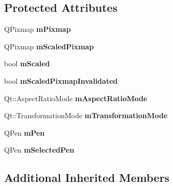 \subsection*{Protected Attributes}
\begin{DoxyCompactItemize}
\item 
Q\+Pixmap {\bfseries m\+Pixmap}\hypertarget{class_q_c_p_item_pixmap_a1396cce7f26c7b8e9512906284380c4d}{}\label{class_q_c_p_item_pixmap_a1396cce7f26c7b8e9512906284380c4d}

\item 
Q\+Pixmap {\bfseries m\+Scaled\+Pixmap}\hypertarget{class_q_c_p_item_pixmap_a2ebc66e15b9f1264563d58f29ba1bc00}{}\label{class_q_c_p_item_pixmap_a2ebc66e15b9f1264563d58f29ba1bc00}

\item 
bool {\bfseries m\+Scaled}\hypertarget{class_q_c_p_item_pixmap_a8fe670a529cd46a9b8afd9fc1203bc3f}{}\label{class_q_c_p_item_pixmap_a8fe670a529cd46a9b8afd9fc1203bc3f}

\item 
bool {\bfseries m\+Scaled\+Pixmap\+Invalidated}\hypertarget{class_q_c_p_item_pixmap_a223134abd4cf3d6c368573c622bd2e1c}{}\label{class_q_c_p_item_pixmap_a223134abd4cf3d6c368573c622bd2e1c}

\item 
Qt\+::\+Aspect\+Ratio\+Mode {\bfseries m\+Aspect\+Ratio\+Mode}\hypertarget{class_q_c_p_item_pixmap_a8dc6b6c1e106ac523efae22d5fe55bab}{}\label{class_q_c_p_item_pixmap_a8dc6b6c1e106ac523efae22d5fe55bab}

\item 
Qt\+::\+Transformation\+Mode {\bfseries m\+Transformation\+Mode}\hypertarget{class_q_c_p_item_pixmap_ac9ecad3b9842363754e32eda2cf821bd}{}\label{class_q_c_p_item_pixmap_ac9ecad3b9842363754e32eda2cf821bd}

\item 
Q\+Pen {\bfseries m\+Pen}\hypertarget{class_q_c_p_item_pixmap_acfee1124eb51a1887aaf8de10777c7a1}{}\label{class_q_c_p_item_pixmap_acfee1124eb51a1887aaf8de10777c7a1}

\item 
Q\+Pen {\bfseries m\+Selected\+Pen}\hypertarget{class_q_c_p_item_pixmap_a0949e5bb6a261fc4e9668e28e2effcfa}{}\label{class_q_c_p_item_pixmap_a0949e5bb6a261fc4e9668e28e2effcfa}

\end{DoxyCompactItemize}
\subsection*{Additional Inherited Members}



